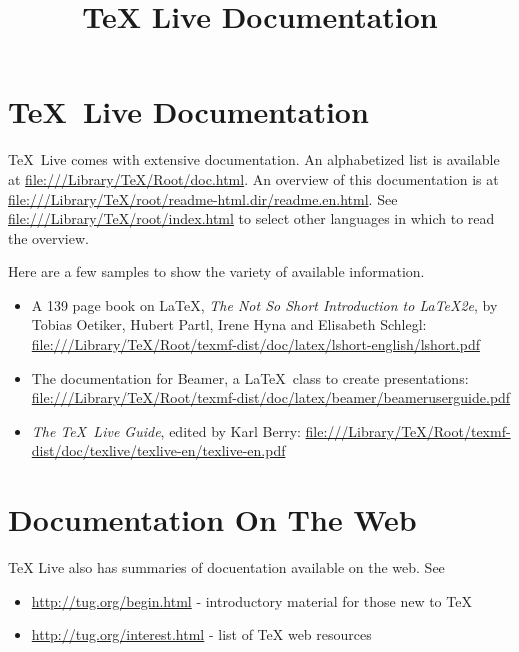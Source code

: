 \documentclass[12pt, oneside]{article}
\title{TeX Live Documentation}
\begin{document}

\section{\TeX\ Live Documentation}

\TeX\ Live comes with extensive documentation. An alphabetized list is available at 
\url{file:///Library/TeX/Root/doc.html}. An overview of this documentation is at \url{file:///Library/TeX/root/readme-html.dir/readme.en.html}. See  \url{file:///Library/TeX/root/index.html} to select other languages in which to read the overview.


Here are a few samples to show the variety of available information. 

\begin{itemize}
\item
     A 139 page book on \LaTeX, \emph {The Not So Short Introduction to \LaTeX 2e}, by Tobias Oetiker, Hubert Partl, Irene Hyna and Elisabeth Schlegl: 
     \url{file:///Library/TeX/Root/texmf-dist/doc/latex/lshort-english/lshort.pdf}
     
\item     The documentation for Beamer, a \LaTeX\ class to create presentations:
     \url{file:///Library/TeX/Root/texmf-dist/doc/latex/beamer/beameruserguide.pdf} 
     
\item     \emph{The \TeX\ Live Guide}, edited by Karl Berry:
    \url{file:///Library/TeX/Root/texmf-dist/doc/texlive/texlive-en/texlive-en.pdf}


\end{itemize}



\section{Documentation On The Web}

TeX Live also has summaries of docuentation available on the web. See
\begin{itemize}
\item \url{http://tug.org/begin.html} - introductory material for those new to TeX
\item \url{http://tug.org/interest.html} - list of TeX web resources
\end{itemize}
\end{document}
